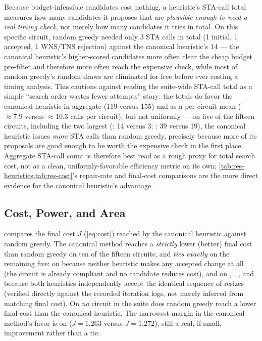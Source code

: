 Because budget-infeasible candidates cost nothing, a heuristic's STA-call
total measures how many candidates it proposes that are \emph{plausible
enough to need a real timing check}, not merely how many candidates it
tries in total. On this specific circuit, random greedy needed only 3 STA
calls in total (1 initial, 1 accepted, 1 WNS/TNS rejection) against the
canonical heuristic's 14 --- the canonical heuristic's higher-scored
candidates more often clear the cheap budget pre-filter and therefore more
often reach the expensive check, while most of random greedy's random
draws are eliminated for free before ever costing a timing analysis. This
cautions against reading the suite-wide STA-call total as a simple
``search order wastes fewer attempts'' story: the totals do favor the
canonical heuristic in aggregate (119 versus 155) and as a per-circuit
mean ($\approx 7.9$ versus $\approx 10.3$ calls per circuit), but not
uniformly --- on five of the fifteen circuits, including the two largest
(: 14 versus 3; : 39 versus 19), the canonical
heuristic issues \emph{more} STA calls than random greedy, precisely
because more of its proposals are good enough to be worth the expensive
check in the first place. Aggregate STA-call count is therefore best read
as a rough proxy for total search cost, not as a clean, uniformly-favorable
efficiency metric on its own; \cref{tab:res-heuristics,tab:res-cost}'s
repair-rate and final-cost comparisons are the more direct evidence for
the canonical heuristic's advantage.

\subsection{Cost, Power, and Area}
\label{sec:res-cost}

 compares the final cost $J$ (\cref{eq:cost}) reached by
the canonical heuristic against random greedy. The canonical method
reaches a \emph{strictly} lower (better) final cost than random greedy on
ten of the fifteen circuits, and \emph{ties exactly} on the remaining
five: on  because neither heuristic makes any accepted change at
all (the circuit is already compliant and no candidate reduces cost), and
on , , , and  because both
heuristics independently accept the identical sequence of resizes (verified
directly against the recorded iteration logs, not merely inferred from
matching final cost). On \emph{no} circuit in the suite does random greedy
reach a lower final cost than the canonical heuristic. The narrowest
margin in the canonical method's favor is on 
($J = 1.263$ versus $J = 1.272$), still a real, if small, improvement
rather than a tie.

